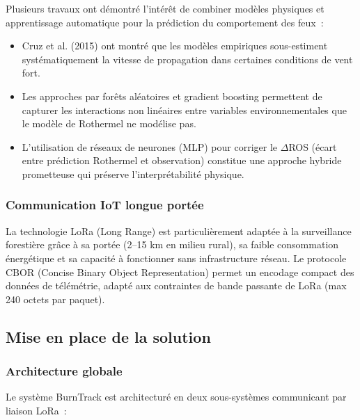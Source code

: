 \documentclass[a4paper,12pt,openany,titlepage]{scrartcl}
\begin{document}
Plusieurs travaux ont démontré l'intérêt de combiner modèles physiques et apprentissage automatique pour la prédiction du comportement des feux~:

\begin{itemize}[nosep]
    \item Cruz et al. (2015) ont montré que les modèles empiriques sous-estiment systématiquement la vitesse de propagation dans certaines conditions de vent fort.
    \item Les approches par forêts aléatoires et gradient boosting permettent de capturer les interactions non linéaires entre variables environnementales que le modèle de Rothermel ne modélise pas.
    \item L'utilisation de réseaux de neurones (MLP) pour corriger le $\Delta$ROS (écart entre prédiction Rothermel et observation) constitue une approche hybride prometteuse qui préserve l'interprétabilité physique.
\end{itemize}

\subsubsection{Communication IoT longue portée}

La technologie LoRa (Long Range) est particulièrement adaptée à la surveillance forestière grâce à sa portée (2--15 km en milieu rural), sa faible consommation énergétique et sa capacité à fonctionner sans infrastructure réseau. Le protocole CBOR (Concise Binary Object Representation) permet un encodage compact des données de télémétrie, adapté aux contraintes de bande passante de LoRa (max 240 octets par paquet).

\subsection{Mise en place de la solution}

\subsubsection{Architecture globale}

Le système BurnTrack est architecturé en deux sous-systèmes communicant par liaison LoRa~:
\end{document}
